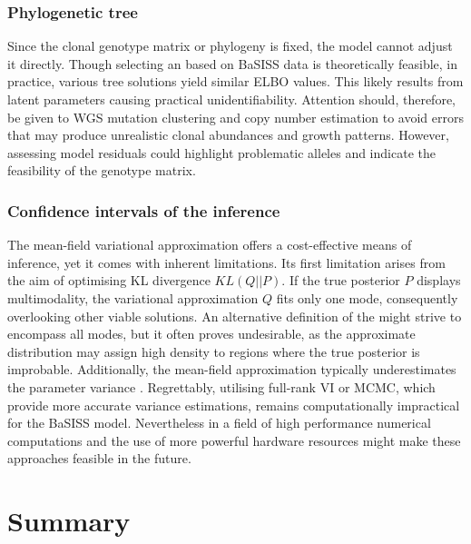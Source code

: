 \subsubsection*{Phylogenetic tree}
Since the clonal genotype matrix or phylogeny is fixed, the model cannot adjust it directly. Though selecting an  based on BaSISS data is theoretically feasible, in practice, various tree solutions yield similar \ac{ELBO} values. This likely results from latent parameters causing practical unidentifiability. Attention should, therefore, be given to \ac{WGS} mutation clustering and copy number estimation to avoid errors that may produce unrealistic clonal abundances and growth patterns. However, assessing model residuals could highlight problematic alleles and indicate the feasibility of the genotype matrix.

\subsubsection*{Confidence intervals of the inference}
The mean-field variational approximation offers a cost-effective means of inference, yet it comes with inherent limitations. Its first limitation arises from the aim of optimising KL divergence $KL(Q||P)$. If the true posterior $P$ displays multimodality, the variational approximation $Q$ fits only one mode, consequently overlooking other viable solutions. An alternative definition of the  might strive to encompass all modes, but it often proves undesirable, as the approximate distribution may assign high density to regions where the true posterior is improbable. Additionally, the mean-field approximation typically underestimates the parameter variance \parencite{Kucukelbir2016-gn}. Regrettably, utilising full-rank \ac{VI} or \ac{MCMC}, which provide more accurate variance estimations, remains computationally impractical for the \ac{BaSISS} model. Nevertheless  in a field of high performance numerical computations and the use of more powerful hardware resources might make these approaches feasible in the future. 

\section{Summary}

